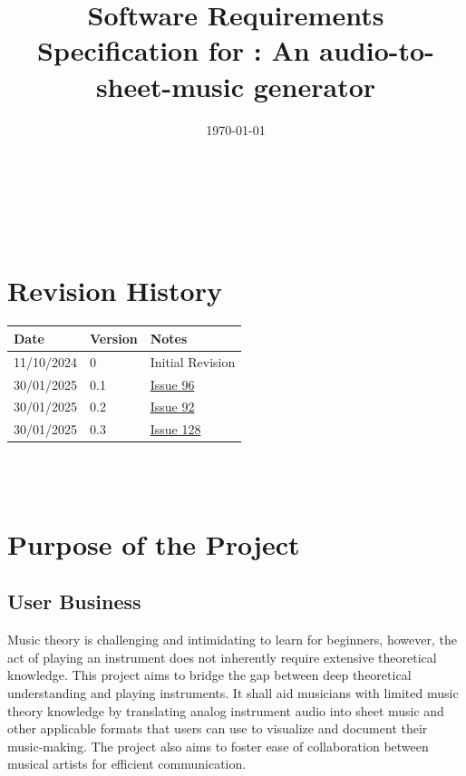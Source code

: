 \documentclass[12pt]{article}
\begin{document}
\title{Software Requirements Specification for \progname: An audio-to-sheet-music generator} 
\author{\authname}
\date{\today}
	
\maketitle
\thispagestyle{empty}

~\newpage


\tableofcontents

~\newpage

\section*{Revision History}

\begin{tabularx}{\textwidth}{p{3cm}p{2cm}X}
\toprule {\textbf{Date}} & {\textbf{Version}} & {\textbf{Notes}}\\
\midrule
11/10/2024 & 0 & Initial Revision\\
30/01/2025 & 0.1 & \href{https://github.com/emilyperica/ScoreGen/issues/96}{Issue 96}\\
30/01/2025 & 0.2 & \href{https://github.com/emilyperica/ScoreGen/issues/92}{Issue 92}\\
30/01/2025 & 0.3 & \href{https://github.com/emilyperica/ScoreGen/issues/128}{Issue 128}\\
\bottomrule
\end{tabularx}

~\\

~\newpage

\section{Purpose of the Project}
\subsection{User Business}
Music theory is challenging and intimidating to learn for beginners, 
however, the act of playing an instrument does not inherently require 
extensive theoretical knowledge. This project aims to bridge the gap 
between deep theoretical understanding and playing instruments. It 
shall aid musicians with limited music theory knowledge by translating 
analog instrument audio into sheet music and other applicable formats 
that users can use to visualize and document their music-making. The 
project also aims to foster ease of collaboration between musical 
artists for efficient communication. 
\end{document}
